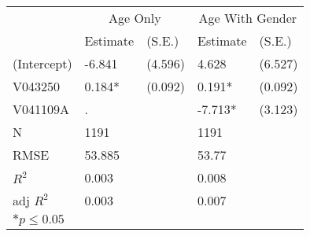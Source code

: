 \begin{tabular}{*{5}{l}}
 \hline
                &\multicolumn{2}{c}{Age Only} &\multicolumn{2}{c}{Age With Gender}   \\
                &Estimate &(S.E.)  &Estimate &(S.E.) \\
 \hline
 \hline
  (Intercept)    & -6.841  &   (4.596) &  4.628  &   (6.527) \\
  V043250        &  0.184*  &   (0.092) &  0.191*  &   (0.092) \\
  V041109A        & .       &         & -7.713*  &   (3.123) \\
 \hline 
 N                &1191      &      &1191      &       \\
 RMSE            &53.885        &&53.77        & \\
 $R^2$           &0.003        &&0.008        & \\
 adj $R^2$       &0.003        &&0.007        & \\
 \hline
 \hline
 
 \multicolumn{2}{l}{${*}  p \le 0.05$   }\\
 \end{tabular}